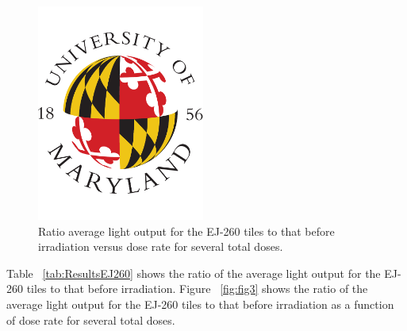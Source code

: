 \documentclass[review]{elsarticle}
\begin{document}
\begin{figure}[!ht]
\begin{center}
\includegraphics[width=0.49\textwidth]{./figures/placeholder.pdf}
\caption{
Ratio average light output for the EJ-260 tiles to that before irradiation versus dose rate for several total doses.
}
\label{fig:fig2}
\end{center}
\end{figure}

Table ~\ref{tab:ResultsEJ260} shows the ratio of the average light output
for the EJ-260 tiles to that before irradiation.
Figure ~\ref{fig:fig3} shows the ratio of the average light output
for the EJ-260 tiles to that before irradiation as a function of dose rate
for several total doses.
\end{document}
